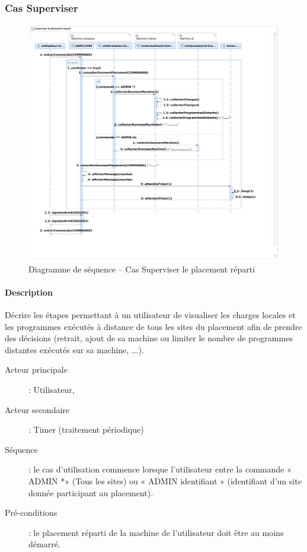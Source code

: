   \subsubsection{Cas Superviser}

  \begin{figure}[h!]
    \centering
    \includegraphics[scale=0.45]{img/analyse_DSseqsuperviser.pdf}
    \caption{Diagramme de séquence -- Cas Superviser le placement réparti}
  \end{figure}

    \paragraph{Description} Décrire les étapes permettant à un utilisateur
      de visualiser les charges locales et les programmes exécutés à
      distance de tous les sites du placement afin de prendre des décisions
      (retrait, ajout de sa machine ou limiter le nombre de programmes
      distantes exécutés sur sa machine, ...).
      \begin{description}
        \item[Acteur principale] : Utilisateur,
        \item[Acteur secondaire] : Timer (traitement périodique)
        \item[Séquence] : le cas d'utilisation commence lorsque l'utilisateur entre la commande « ADMIN *»
        (Tous les sites) ou « ADMIN identifiant » (identifiant d'un site donnée participant au placement).
        \item[Pré-conditions] : le placement réparti de la machine de l'utilisateur doit être au moins démarré.
      \end{description}

